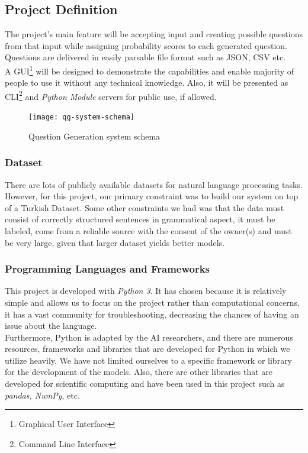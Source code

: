 \documentclass{mefsdp}
\begin{document}
	\subsection{Project Definition}
	The project's main feature will be accepting input and creating possible questions from that input while assigning probability scores to each generated question. Questions are delivered in easily parsable file format such as JSON, CSV etc.\\
	
	A GUI\footnote{Graphical User Interface} will be designed to demonstrate the capabilities and enable majority of people to use it without any technical knowledge. Also, it will be presented as CLI\footnote{Command Line Interface} and \textit{Python Module}\footnotemark {} servers for public use, if allowed.
	\\
	
	\begin{figure}[ht!]
		\centering
		\texttt{[image: qg-system-schema]}
		\caption{Question Generation system schema}
	\end{figure}
	
	\subsubsection{Dataset}
	There are lots of publicly available datasets for natural language processing tasks. However, for this project, our primary constraint was to build our system on top of a Turkish Dataset. Some other constraints we had was that the data must consist of correctly structured sentences in grammatical aspect, it must be labeled, come from a reliable source with the consent of the owner(s) and must be very large, given that larger dataset yields better models.
	
	\subsubsection{Programming Languages and Frameworks}
	This project is developed with \textit{Python 3}. It has chosen because it is relatively simple and allows us to focus on the project rather than computational concerns, it has a vast community for troubleshooting, decreasing the chances of having an issue about the language.\\
	
	Furthermore, Python is adapted by the AI researchers, and there are numerous resources, frameworks and libraries that are developed for Python in which we utilize heavily. We have not limited ourselves to a specific framework or library for the development of the models. Also, there are other libraries that are developed for scientific computing and have been used in this project such as \textit{pandas, NumPy}, etc.\\
	
\end{document}
